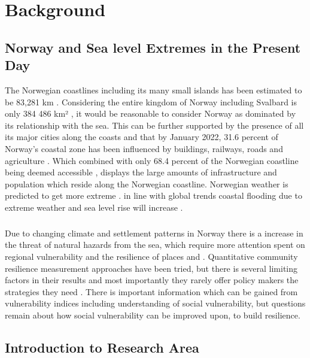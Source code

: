 \chapter{Background}

\section{Norway and Sea level Extremes in the Present Day}
The Norwegian coastlines including its many small islands has been estimated to be 83,281 km \cite{aunan_strong_2008}. Considering the entire kingdom of Norway including Svalbard is only 384 486 km² \cite{engelien_area_2022}, it would be reasonable to consider Norway as dominated by its relationship with the sea. This can be further supported by the presence of all its major cities along the coasts and that by January 2022, 31.6 percent of Norway's coastal zone has been influenced by buildings, railways, roads and agriculture \cite{engebakken_construction_2022}. Which combined with only 68.4 percent of the Norwegian coastline being deemed accessible \cite{engebakken_construction_2022}, displays the large amounts of infrastructure and population which reside along the Norwegian coastline. Norwegian weather is predicted to get more extreme \cite{rod_integrated_2012}. in line with global trends coastal flooding due to extreme weather and sea level rise will increase \cite{hoffken_effects_2020}. 
\paragraph{}

Due to changing climate and settlement patterns in Norway there is a increase in the threat of natural hazards from the sea, which require more attention spent on regional vulnerability and the resilience of places \cite{opach_seeking_2020} and \cite{rod_three_2015} . Quantitative community resilience measurement approaches have been tried, but there is several limiting factors in their results and most importantly they rarely offer policy makers the strategies they need \cite{opach_seeking_2020}. There is important information which can be gained from vulnerability indices including understanding of social vulnerability, but questions remain about how social vulnerability can be improved upon, to build resilience. 


\section{Introduction to Research Area}

